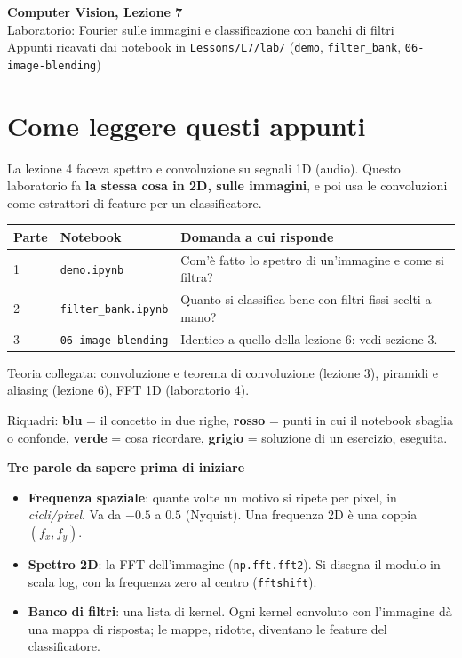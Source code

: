 \documentclass[11pt,a4paper]{article}
\newcommand{\code}[1]{\texttt{#1}}
\begin{document}
\begin{center}
{\LARGE\bfseries Computer Vision, Lezione 7}\\[3pt]
{\large Laboratorio: Fourier sulle immagini e classificazione con banchi di filtri}\\[3pt]
{\small Appunti ricavati dai notebook in \code{Lessons/L7/lab/} (\code{demo}, \code{filter\_bank}, \code{06-image-blending})}
\end{center}

\section*{Come leggere questi appunti}

La lezione 4 faceva spettro e convoluzione su segnali 1D (audio). Questo laboratorio fa \textbf{la stessa cosa in 2D, sulle immagini}, e poi usa le convoluzioni come estrattori di feature per un classificatore.

\begin{center}
\begin{tabular}{@{}lll@{}}
\toprule
Parte & Notebook & Domanda a cui risponde \\
\midrule
1 & \code{demo.ipynb} & Com'è fatto lo spettro di un'immagine e come si filtra? \\
2 & \code{filter\_bank.ipynb} & Quanto si classifica bene con filtri fissi scelti a mano? \\
3 & \code{06-image-blending} & Identico a quello della lezione 6: vedi sezione 3. \\
\bottomrule
\end{tabular}
\end{center}

Teoria collegata: convoluzione e teorema di convoluzione (lezione 3), piramidi e aliasing (lezione 6), FFT 1D (laboratorio 4).

Riquadri: \textcolor{idea}{\textbf{blu}} = il concetto in due righe, \textcolor{attn}{\textbf{rosso}} = punti in cui il notebook sbaglia o confonde, \textcolor{exam}{\textbf{verde}} = cosa ricordare, \textbf{grigio} = soluzione di un esercizio, eseguita.

\medskip
\textbf{Tre parole da sapere prima di iniziare}
\begin{itemize}
  \item \textbf{Frequenza spaziale}: quante volte un motivo si ripete per pixel, in \emph{cicli/pixel}. Va da $-0.5$ a $0.5$ (Nyquist). Una frequenza 2D è una coppia $(f_x, f_y)$.
  \item \textbf{Spettro 2D}: la FFT dell'immagine (\code{np.fft.fft2}). Si disegna il modulo in scala log, con la frequenza zero al centro (\code{fftshift}).
  \item \textbf{Banco di filtri}: una lista di kernel. Ogni kernel convoluto con l'immagine dà una mappa di risposta; le mappe, ridotte, diventano le feature del classificatore.
\end{itemize}
\end{document}
